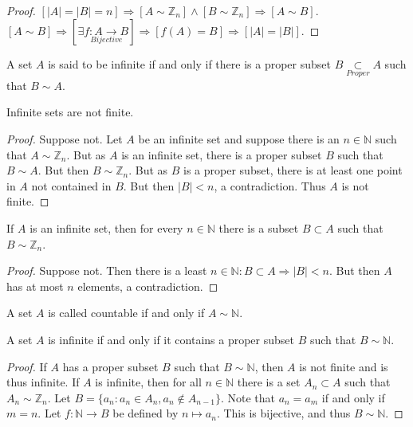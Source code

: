         \begin{proof}
        $[|A|=|B|=n]\Rightarrow[A\sim \mathbb{Z}_n]\land[B\sim \mathbb{Z}_n]\Rightarrow [A\sim B]$.
        $[A\sim B]\Rightarrow [\exists \underset{Bijective}{f:A\rightarrow B}]\Rightarrow [f(A) = B]\Rightarrow [|A|=|B|]$.
        \end{proof}
        \begin{definition}
        A set $A$ is said to be infinite if and only if there is a proper subset $B\underset{Proper}\subset A$ such that $B\sim A$.
        \end{definition}
        \begin{theorem}
        Infinite sets are not finite.
        \end{theorem}
        \begin{proof}
        Suppose not. Let $A$ be an infinite set and suppose there is an $n\in \mathbb{N}$ such
        that $A\sim \mathbb{Z}_n$. But as $A$ is an infinite set, there is a proper subset $B$
        such that $B\sim A$. But then $B\sim \mathbb{Z}_n$. But as $B$ is a proper subset,
        there is at least one point in $A$ not contained in $B$. But then $|B|<n$, a contradiction. Thus $A$ is not finite.
        \end{proof}
        \begin{theorem}
            If $A$ is an infinite set, then for every $n\in \mathbb{N}$
            there is a subset $B\subset A$ such that $B\sim \mathbb{Z}_n$.
        \end{theorem}
        \begin{proof}
        Suppose not. Then there is a least $n\in \mathbb{N}:B\subset A\Rightarrow |B|<n$.
        But then $A$ has at most $n$ elements, a contradiction.
        \end{proof}
        \begin{definition}
            A set $A$ is called countable if and only if $A\sim \mathbb{N}$.
        \end{definition}
        \begin{theorem}
        A set $A$ is infinite if and only if it contains a proper subset $B$ such that $B\sim \mathbb{N}$.
        \end{theorem}
        \begin{proof}
        If $A$ has a proper subset $B$ such that $B\sim \mathbb{N}$, then $A$ is not finite and is thus infinite.
        If $A$ is infinite, then for all $n\in \mathbb{N}$ there is a set $A_n\subset A$ such that
        $A_n \sim \mathbb{Z}_n$. Let $B = \{a_n: a_n \in A_n, a_n \notin A_{n-1}\}$.
        Note that $a_{n} = a_{m}$ if and only if $m= n$. Let $f:\mathbb{N} \rightarrow B$
        be defined by $n\mapsto a_n$. This is bijective, and thus $B\sim \mathbb{N}$.
        \end{proof}

